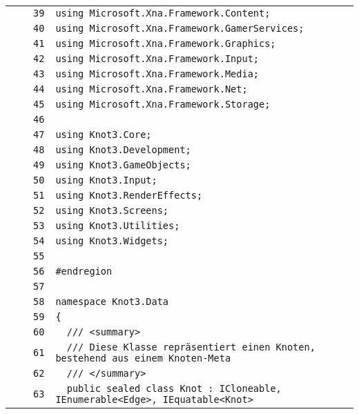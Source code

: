 \documentclass[a4paper,10pt]{article}
\begin{document}
\begin{longtable}[l]{lrrl}
\cellcolor{gray} &  & \verb~39~ & \verb~using Microsoft.Xna.Framework.Content;~\\
\cellcolor{gray} &  & \verb~40~ & \verb~using Microsoft.Xna.Framework.GamerServices;~\\
\cellcolor{gray} &  & \verb~41~ & \verb~using Microsoft.Xna.Framework.Graphics;~\\
\cellcolor{gray} &  & \verb~42~ & \verb~using Microsoft.Xna.Framework.Input;~\\
\cellcolor{gray} &  & \verb~43~ & \verb~using Microsoft.Xna.Framework.Media;~\\
\cellcolor{gray} &  & \verb~44~ & \verb~using Microsoft.Xna.Framework.Net;~\\
\cellcolor{gray} &  & \verb~45~ & \verb~using Microsoft.Xna.Framework.Storage;~\\
\cellcolor{gray} &  & \verb~46~ & \verb~~\\
\cellcolor{gray} &  & \verb~47~ & \verb~using Knot3.Core;~\\
\cellcolor{gray} &  & \verb~48~ & \verb~using Knot3.Development;~\\
\cellcolor{gray} &  & \verb~49~ & \verb~using Knot3.GameObjects;~\\
\cellcolor{gray} &  & \verb~50~ & \verb~using Knot3.Input;~\\
\cellcolor{gray} &  & \verb~51~ & \verb~using Knot3.RenderEffects;~\\
\cellcolor{gray} &  & \verb~52~ & \verb~using Knot3.Screens;~\\
\cellcolor{gray} &  & \verb~53~ & \verb~using Knot3.Utilities;~\\
\cellcolor{gray} &  & \verb~54~ & \verb~using Knot3.Widgets;~\\
\cellcolor{gray} &  & \verb~55~ & \verb~~\\
\cellcolor{gray} &  & \verb~56~ & \verb~#endregion~\\
\cellcolor{gray} &  & \verb~57~ & \verb~~\\
\cellcolor{gray} &  & \verb~58~ & \verb~namespace Knot3.Data~\\
\cellcolor{gray} &  & \verb~59~ & \verb~{~\\
\cellcolor{gray} &  & \verb~60~ & \verb~  /// <summary>~\\
\cellcolor{gray} &  & \verb~61~ & \verb~  /// Diese Klasse repräsentiert einen Knoten, bestehend aus einem Knoten-Meta~\\
\cellcolor{gray} &  & \verb~62~ & \verb~  /// </summary>~\\
\cellcolor{gray} &  & \verb~63~ & \verb~  public sealed class Knot : ICloneable, IEnumerable<Edge>, IEquatable<Knot>~\\

\end{longtable}
\end{document}
